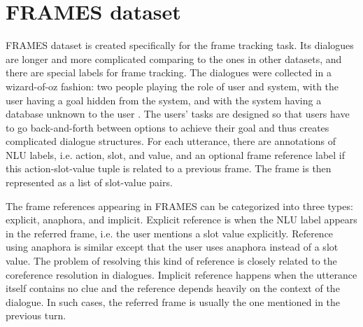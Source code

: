 \section{FRAMES dataset}

FRAMES dataset is created specifically for the frame tracking task. Its dialogues are longer and more complicated comparing to the ones in other datasets, and there are special labels for frame tracking. The dialogues were collected in a wizard-of-oz fashion: two people playing the role of user and system, with the user having a goal hidden from the system, and with the system having a database unknown to the user \cite{kelley1984iterative, rieser2005corpus, wen2016network}. The users' tasks are designed so that users have to go back-and-forth between options to achieve their goal and thus creates complicated dialogue structures.
For each utterance, there are annotations of NLU labels, i.e. action, slot, and value, and an optional frame reference label if this action-slot-value tuple is related to a previous frame. The frame is then represented as a list of slot-value pairs.

The frame references appearing in FRAMES can be categorized into three types: explicit, anaphora, and implicit. Explicit reference is when the NLU label appears in the referred frame, i.e. the user mentions a slot value explicitly. Reference using anaphora is similar except that the user uses anaphora instead of a slot value. The problem of resolving this kind of reference is closely related to the coreference resolution in dialogues. Implicit reference happens when the utterance itself contains no clue and the reference depends heavily on the context of the dialogue. In such cases, the referred frame is usually the one mentioned in the previous turn.

